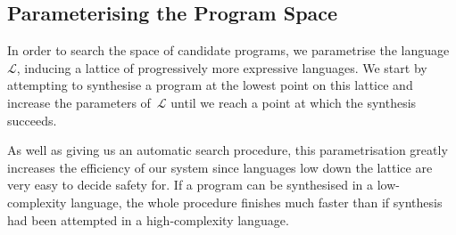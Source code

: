 





\subsection{Parameterising the Program Space}

In order to search the space of candidate programs, we parametrise
the language~$\mathcal{L}$, inducing a lattice of progressively
more expressive languages.  We start by attempting to synthesise
a program at the lowest point on this lattice and increase the
parameters of~$\mathcal{L}$ until we reach a point at which
the synthesis succeeds.

As well as giving us an automatic search procedure, this parametrisation
greatly increases the efficiency of our system since languages
low down the lattice are very easy to decide safety for.  If a program
can be synthesised in a low-complexity language, the whole procedure
finishes much faster than if synthesis had been attempted in a
high-complexity language.


